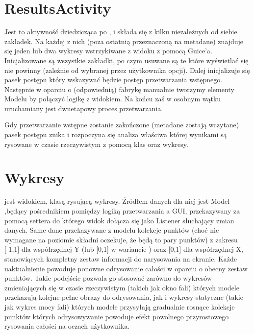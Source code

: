 \section{ResultsActivity}
Jest to aktywność dziedzicząca po , i składa się z kilku niezależnych od siebie zakładek. Na każdej z nich (poza ostatnią przeznaczoną na metadane) znajduje się jeden lub dwa wykresy wstrzykiwane z widoku z pomocą Guice'a. Inicjalizowane są wszystkie zakładki, po czym usuwane są te które wyświetlać się nie powinny (zależnie od wybranej przez użytkownika opcji). Dalej inicjalizuje się pasek postępu który wskazywać będzie postęp przetwarzania wstępnego. Następnie w oparciu o (odpowiednią) fabrykę manualnie tworzymy elementy Modelu by połączyć logikę z widokiem. Na końcu zaś w osobnym wątku uruchamiany jest dwuetapowy proces przetwarzania.

Gdy przetwarzanie wstępne zostanie zakończone (metadane zostają wczytane) pasek postępu znika i rozpoczyna się analiza właściwa której wynikami są rysowane w czasie rzeczywistym z pomocą klas  oraz  wykresy.

\section{Wykresy}
 jest widokiem, klasą rysującą wykresy. Źródłem danych dla niej jest Model ,będący pośrednikiem pomiędzy logiką przetwarzania a GUI, przekazywany za pomocą settera do którego widok dołącza się jako Listener słuchający zmian danych. Same dane przekazywane z modelu kolekcje punktów (choć nie wymagane na poziomie składni oczekuje, że będą to pary punktów) z zakresu [-1,1] dla współrzędnej Y (lub [0,1] w wariancie ) oraz [0,1] dla współrzędnej X, stanowiących kompletny zestaw informacji do narysowania na ekranie. Każde uaktualnienie powoduje ponowne odrysowanie całości w oparciu o obecny zestaw punktów. Takie podejście pozwala go stosować zarówno do wykresów zmieniających się w czasie rzeczywistym (takich jak okno fali) których modele przekazują kolejne pełne obrazy do odrysowania, jak i wykresy statyczne (takie jak wykres mocy fali) których modele przysyłają gradualnie rosnące kolekcje punktów których odrysowywanie powoduje efekt powolnego przyrostowego rysowania całości na oczach użytkownika.

